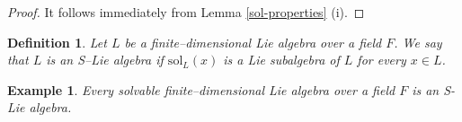 \documentclass[11pt]{amsart}
\theoremstyle{plain}
\newtheorem{lemma}[theorem]{Lemma}
\newtheorem{definition}{Definition}[section]
\newtheorem{example}[theorem]{Example}
\def\N{\mathbb{N}}
\def\sol{\mathrm{sol}}
\begin{document}
\begin{proof}
It follows immediately from Lemma \ref{sol-properties} (i).


\end{proof}

\begin{definition}\label{S-Lie}
Let $L$ be a finite–dimensional Lie algebra over a field $F$. We say that $L$ is an S–Lie algebra if $\sol_L(x)$ is a Lie subalgebra of $L$ for every $x\in L$.
\end{definition}

\begin{example}
Every solvable finite–dimensional Lie algebra over a field $F$ is an S-Lie algebra.
\end{example}








\end{document}
